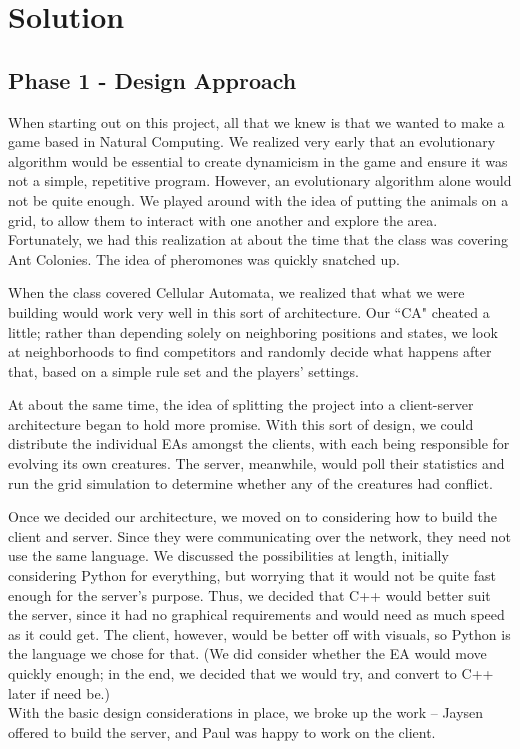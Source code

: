 
\chapter{Solution}

\section{Phase 1 - Design Approach}

When starting out on this project, all that we knew is that we wanted to make a
game based in Natural Computing. We realized very early that an evolutionary
algorithm would be essential to create dynamicism in the game and ensure it was not
a simple, repetitive program. However, an evolutionary algorithm alone would not be
quite enough. We played around with the idea of putting the animals on a grid, to
allow them to interact with one another and explore the area. \\
Fortunately, we had this realization at about the time that the class was covering
Ant Colonies. The idea of pheromones was quickly snatched up.

When the class covered Cellular Automata, we realized that what we were building
would work very well in this sort of architecture. Our ``CA" cheated a little;
rather than depending solely on neighboring positions and states, we look at
neighborhoods to find competitors and randomly decide what happens after that,
based on a simple rule set and the players' settings.

At about the same time, the idea of splitting the project into a client-server
architecture began to hold more promise. With this sort of design, we could
distribute the individual EAs amongst the clients, with each being responsible for
evolving its own creatures. The server, meanwhile, would poll their statistics and
run the grid simulation to determine whether any of the creatures had conflict.

Once we decided our architecture, we moved on to considering how to build the 
client and server. Since they were communicating over the network, they need not
use the same language. We discussed the possibilities at length, initially 
considering Python for everything, but worrying that it would not be quite fast
enough for the server's purpose. Thus, we decided that C++ would better suit the
server, since it had no graphical requirements and would need as much speed as it
could get. The client, however, would be better off with visuals, so Python is the
language we chose for that. (We did consider whether the EA would move quickly
enough; in the end, we decided that we would try, and convert to C++ later if need
be.) \\
With the basic design considerations in place, we broke up the work -- Jaysen
offered to build the server, and Paul was happy to work on the client.

